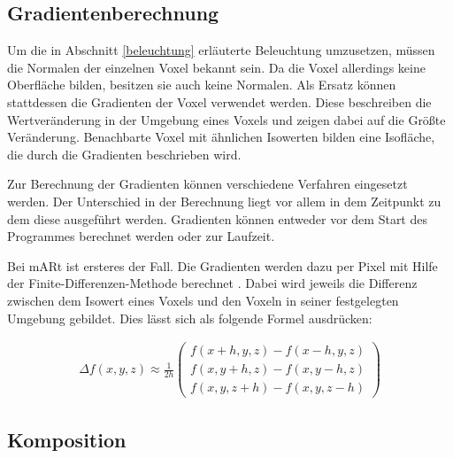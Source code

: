 \subsection{Gradientenberechnung}

Um die in Abschnitt \ref{beleuchtung} erläuterte Beleuchtung umzusetzen, müssen die Normalen der einzelnen Voxel bekannt sein. Da die Voxel allerdings keine Oberfläche bilden, besitzen sie auch keine Normalen. Als Ersatz können stattdessen die Gradienten der Voxel verwendet werden. Diese beschreiben die Wertveränderung in der Umgebung eines Voxels und zeigen dabei auf die Größte Veränderung. Benachbarte Voxel mit ähnlichen Isowerten bilden eine Isofläche, die durch die Gradienten beschrieben wird. 

Zur Berechnung der Gradienten können verschiedene Verfahren eingesetzt werden. Der Unterschied in der Berechnung liegt vor allem in dem Zeitpunkt zu dem diese ausgeführt werden. Gradienten können entweder vor dem Start des Programmes berechnet werden oder zur Laufzeit. 

Bei mARt ist ersteres der Fall. Die Gradienten werden dazu per Pixel mit Hilfe der Finite-Differenzen-Methode berechnet \cite{Hadwiger06}.
Dabei wird jeweils die Differenz zwischen dem Isowert eines Voxels und den Voxeln in seiner festgelegten Umgebung gebildet. Dies lässt sich als folgende Formel ausdrücken: 

\begin{align}
\Delta f(x,y,z)\approx \frac{1}{2h}
\left ( \begin{matrix}
f(x + h, y, z) - f(x - h, y, z)\\ 
f(x, y + h, z) - f(x, y - h, z)\\ 
f(x, y, z + h) - f(x, y, z - h)
\end{matrix} \right )
\end{align}



\subsection{Komposition}

